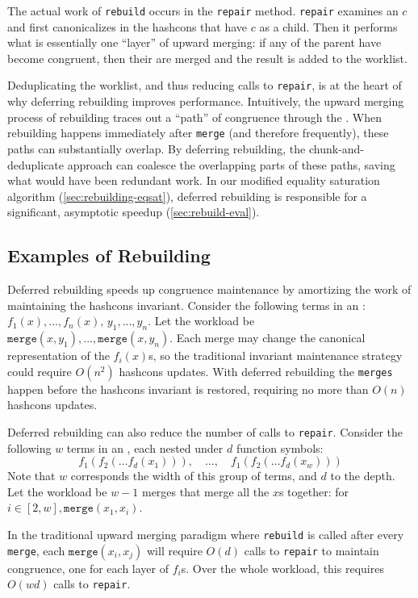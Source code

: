 The actual work of \texttt{rebuild} occurs in the \texttt{repair} method.
\texttt{repair} examines an \eclass $c$ and first canonicalizes \enodes in the
  hashcons that have $c$ as a child.
Then it performs what is essentially one ``layer'' of upward
  merging:
if any of the parent \enodes have become congruent, then their
  \eclasses are merged and the result is added to the worklist.

Deduplicating the worklist, and thus reducing calls to \texttt{repair},
  is at the heart of why deferring rebuilding improves
  performance.
Intuitively, the upward merging process of rebuilding traces out a ``path'' of
  congruence through the \egraph.
When rebuilding happens immediately after \texttt{merge}
  (and therefore frequently), these paths can substantially overlap.
By deferring rebuilding, the chunk-and-deduplicate approach can coalesce the
overlapping parts of these paths, saving what would have been redundant work.
In our modified equality saturation algorithm (\autoref{sec:rebuilding-eqsat}),
  deferred rebuilding is responsible for a significant, asymptotic speedup
  (\autoref{sec:rebuild-eval}).

\subsection{Examples of Rebuilding}

Deferred rebuilding speeds up congruence maintenance by amortizing the work of
  maintaining the hashcons invariant.
Consider the following terms in an \egraph:
  $f_{1}(x), ..., f_{n}(x),\, y_{1}, ..., y_{n}$.
Let the workload be $\texttt{merge}(x, y_{1}), ..., \texttt{merge}(x, y_{n})$.
Each merge may change the canonical representation of the $f_{i}(x)$s,
  so the traditional invariant maintenance strategy
  could require $O(n^{2})$ hashcons updates.
With deferred rebuilding the \texttt{merges} happen before
  the hashcons invariant is restored,
  requiring no more than $O(n)$ hashcons updates.

Deferred rebuilding can also reduce the number of calls to \texttt{repair}.
Consider the following $w$ terms in an \egraph,
  each nested under $d$ function symbols:
  $$f_1 (f_2(\ldots f_d(x_1))), \quad\ldots,\quad f_1(f_2(\ldots f_d(x_w)))$$
Note that $w$ corresponds the width of this group of terms, and $d$ to the depth.
Let the workload be $w-1$ merges that merge all the $x$s together:
  for $i \in [2, w], \texttt{merge}(x_{1}, x_{i})$.

In the traditional upward merging paradigm
  where \texttt{rebuild} is called after every \texttt{merge},
  each $\texttt{merge}(x_i, x_j)$ will require $O(d)$ calls to \texttt{repair}
  to maintain congruence, one for each layer of $f_{i}$s.
Over the whole workload, this requires $O(wd)$ calls to \texttt{repair}.

